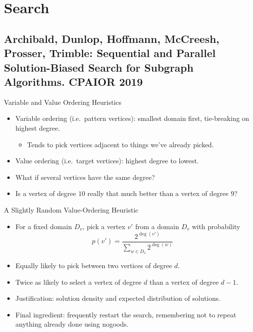 \documentclass[aspectratio=169,compress,10pt]{beamer}
\begin{document}
\section{Search}

\subsection{Archibald, Dunlop, Hoffmann, McCreesh, Prosser, Trimble: Sequential and Parallel Solution-Biased Search for Subgraph Algorithms.
CPAIOR 2019}

\begin{frame}{Variable and Value Ordering Heuristics}
    \begin{itemize}
        \item Variable ordering (i.e.\ pattern vertices): smallest domain first, tie-breaking on highest degree.
            \begin{itemize}
                \item Tends to pick vertices adjacent to things we've already picked.
            \end{itemize}
        \item Value ordering (i.e.\ target vertices): highest degree to lowest.
            \pause
        \item What if several vertices have the same degree?
        \item Is a vertex of degree $10$ really that much better than a vertex of degree $9$?
    \end{itemize}
\end{frame}

\begin{frame}{A Slightly Random Value-Ordering Heuristic}
    \begin{itemize}
        \item For a fixed domain $D_v$, pick a vertex $v'$ from a domain $D_v$ with probability
    \[ p(v') = \frac{2^{\deg(v')}}{\sum_{w \in D_v}{2^{\deg(w)}}} \]
        \item Equally likely to pick between two vertices of degree $d$.
        \item Twice as likely to select a vertex of degree $d$ than a vertex of degree $d - 1$.
        \item Justification: \textcolor{uofgcobalt}{solution density} and expected distribution of solutions.
        \item Final ingredient: frequently \textcolor{uofgcobalt}{restart} the search, remembering
            not to repeat anything already done using \textcolor{uofgcobalt}{nogoods}.
    \end{itemize}
\end{frame}
\end{document}
